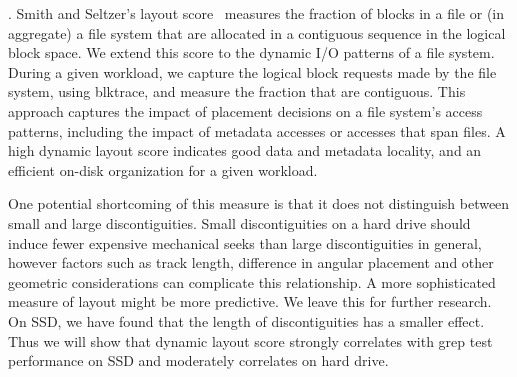 .  Smith and Seltzer's layout
score~\cite{SmithSe97} measures the fraction of blocks in a file or (in
aggregate) a file system that are allocated in a contiguous sequence in the
logical block space.  We extend this score to
the dynamic I/O patterns of a file system.  During a given workload, we capture
the logical block requests made by the file system, using blktrace, and
measure the fraction that are contiguous.
This approach captures the impact of placement decisions on a file system's
access patterns, including the impact of metadata accesses or accesses that
span files.  A high dynamic layout score indicates good data and metadata
locality, and an efficient on-disk organization for a given workload.

One potential shortcoming of this measure is that it does not distinguish
between small and large discontiguities. Small discontiguities on a hard drive
should induce fewer expensive mechanical seeks than large discontiguities in
general, however factors such as track length, difference in angular placement
and other geometric considerations can complicate this relationship. A more
sophisticated measure of layout might be more predictive.  We leave this
for further research. On SSD, we have found that the length of discontiguities
has a smaller effect.
Thus we will show that dynamic layout score strongly correlates with grep test
performance on SSD and moderately correlates on hard drive.





